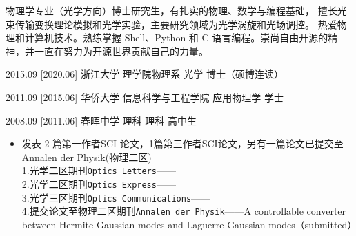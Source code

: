 \documentclass[zh]{resume}
\begin{document}
\makeheader

{\onehalfspacing\hspace{2em}
物理学专业（光学方向）博士研究生，有扎实的物理、数学与编程基础，
擅长光束传输变换理论模拟和光学实验，主要研究领域为光学涡旋和光场调控。
热爱物理和计算机技术。熟练掌握 Shell、Python 和 C 语言编程。崇尚自由开源的精神，并一直在努力为开源世界贡献自己的力量。
\par}


\begin{educations}
  \education%
    {2015.09}%
    [2020.06]%
    {浙江大学}%
    {理学院物理系}%
    {光学}%
    {博士（硕博连读）}

\separator{0.5ex}
\education%
{2011.09}%
[2015.06]%
{华侨大学}%
{信息科学与工程学院}%
{应用物理学}%
{学士}

\separator{0.5ex}
\education%
{2008.09}%
[2011.06]%
{春晖中学}%
{理科}%
{理科}%
{高中生}
\end{educations}

\begin{itemize}
  \item 发表 2 篇第一作者SCI 论文，1篇第三作者SCI论文，另有一篇论文已提交至Annalen der Physik(物理二区)
  \\ 1.光学二区期刊\texttt{Optics Letters}——
  \\ 2.光学二区期刊\texttt{Optics Express}——
  \\ 3.光学三区期刊\texttt{Optics Communications}——
  \\ 4.提交论文至物理二区期刊\texttt{Annalen der Physik}——{A controllable converter between Hermite Gaussian modes and Laguerre Gaussian modes（submitted）}
\end{itemize}
\end{document}
